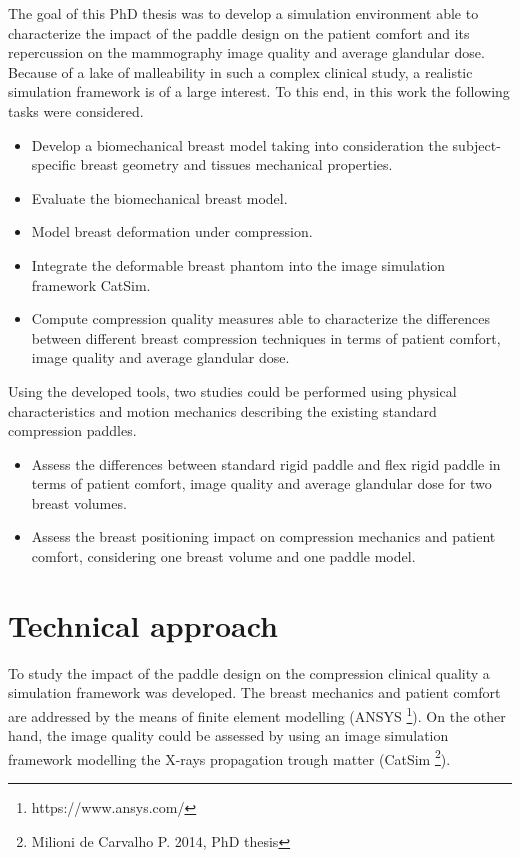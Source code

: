 The goal of this PhD thesis was to develop a simulation environment able to characterize the impact of the paddle design on the patient comfort and its repercussion on the mammography image quality and average glandular dose.  Because of a lake of malleability in such a complex clinical study, a realistic simulation framework is of a large interest. To this end, in this work the following tasks were considered.
\begin{itemize}
\item Develop a biomechanical breast model taking into consideration the subject-specific breast geometry and tissues mechanical properties. 

\item Evaluate the biomechanical breast model. 

\item Model breast deformation under compression.

\item Integrate the deformable breast phantom into the image simulation framework CatSim.
\item Compute compression quality measures able to characterize the differences between different breast compression techniques in terms of patient comfort, image quality and average glandular dose.  

\end{itemize}   

Using the developed tools, two studies could be performed using physical characteristics and motion mechanics describing the existing standard compression paddles.
\begin{itemize}
\item Assess the differences between standard rigid paddle and flex rigid paddle in terms of patient comfort, image quality and average glandular dose for two breast volumes.

\item Assess the breast positioning impact on compression mechanics and patient comfort, considering one breast volume and one paddle model.
\end{itemize}
 
\cleardoublepage
\chapter*{Technical approach}\label{section:technicalapproach}
To study the impact of the paddle design on the compression clinical quality a simulation framework was developed.  The breast mechanics and patient comfort are addressed by the means of finite element modelling (ANSYS \footnote{https://www.ansys.com/}). On the other hand, the image quality could be assessed by using an image simulation framework modelling the X-rays propagation trough matter (CatSim \footnote{Milioni de Carvalho P. 2014, PhD thesis}). 

